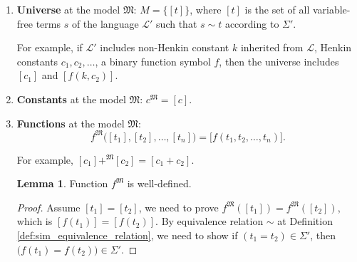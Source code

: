 \documentclass[11pt,letterpaper]{book}
\theoremstyle{definition}
\newtheorem{lemma}{Lemma}[section]
\begin{document}
\begin{enumerate}
\begin{proof}
Reflexive means $t_1 \sim t_1 \iff (t_1 = t_1) \in \Sigma' $. By Theorem
\ref{theorem:equality_equiv_relation}, we know $\Sigma' \vdash (t_1 =
t_1)$ for any $t_1$ as $\mathcal{L}'$-sentence. By Lemma
\ref{lemma:sentence_in_Sigma_prime_deducible}, $ \Sigma' \vdash (t_1 =
t_1) \iff (t_1 = t_1) \in \Sigma' $. Thus, we have $t_1 \sim t_1$.

Transitive means $t_1 \sim t_2$ and $t_2 \sim t_3$ implies $t_1 \sim
t_3$. That is to prove $ (t_1 = t_2 ) \in \Sigma' $ and $(t_2 = t_3) \in
\Sigma'$ implies $ (t_1 = t_3) \in \Sigma' $.

By Lemma \ref{lemma:sentence_in_Sigma_prime_deducible}, $ (t_1 = t_2 )
\in \Sigma' $ and $(t_2 = t_3) \in \Sigma'$ imply that $\Sigma' \vdash
(t_1 = t_2)$ and $\Sigma' \vdash (t_1 = t_3)$. By Theorem
\ref{theorem:equality_equiv_relation}, $\Sigma' \vdash (t_1 = t_2 \land
t_1 = t_3) $ implies $\Sigma' \vdash (t_1 = t_3)$. By Lemma
\ref{lemma:sentence_in_Sigma_prime_deducible}, $\Sigma' \vdash (t_1 =
t_3) \iff (t_1 = t_3) \in \Sigma' $, and thus $t_1 \sim t_3$.

\end{proof}

\item{\textbf{Universe} at the model $\mathfrak{M}$: $M = \{ [t] \}$,
where $[t] $ is the set of all variable-free terms $s$ of the language
$\mathcal{L}'$ such that $s \sim t$ according to $\Sigma'$.

For example, if $\mathcal{L}'$ includes non-Henkin constant $k$
inherited from $\mathcal{L}$, Henkin constants $c_1, c_2, \ldots$, a
binary function symbol $f$, then the universe includes $[c_1]$ and $[f(
k, c_2 )]$.
}

\item{\textbf{Constants} at the model $\mathfrak{M}$: $c^{\mathfrak{M}}
= [c]$.}
\item{\textbf{Functions} at the model $\mathfrak{M}$:
$$ f^{\mathfrak{M}}\big( [t_1], [t_2], \ldots, [t_n] \big) = \big[
f(t_1, t_2, \ldots, t_n) \big] .$$

For example, $ [c_1] +^{\mathfrak{M}} [c_2] = [c_1 + c_2] $.
}

\begin{lemma}
Function $f^{\mathfrak{M}}$ is well-defined.
\end{lemma}

\begin{proof}
Assume $[t_1] = [t_2]$, we need to prove $f^{\mathfrak{M}}([t_1]) =
f^{\mathfrak{M}} ([t_2]) $, which is $[f(t_1)] = [f(t_2)]$. By equivalence
relation $\sim$ at Definition \ref{def:sim_equivalence_relation}, we
need to show if $(t_1 = t_2) \in \Sigma'$, then $\big( f(t_1) = f(t_2)
\big) \in \Sigma'$.


\end{proof}
\end{enumerate}
\end{document}
